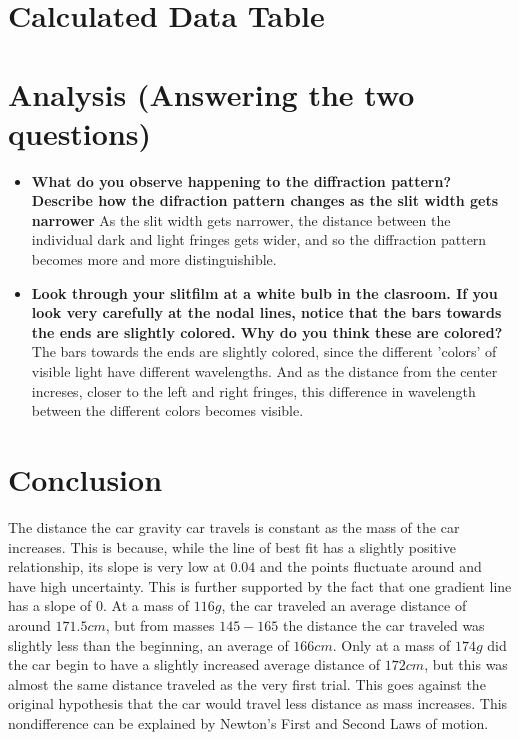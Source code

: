 \documentclass[12pt]{article}
\begin{document}
\section{Calculated Data Table}

\begin{table}[H]
	\def\arraystretch{1.5}
\end{table}

\section{Analysis (Answering the two questions)}


\begin{itemize}
	\item \textbf{What do you observe happening to the diffraction pattern? Describe how the difraction pattern changes as the slit width gets narrower}
	      \subitem As the slit width gets narrower, the distance between the individual dark and light fringes gets wider, and so the diffraction pattern becomes more and more distinguishible.
	\item \textbf{Look through your slitfilm at a white bulb in the clasroom. If you look very carefully at the nodal lines, notice that the bars towards the ends are slightly colored. Why do you think these are colored?}
	      \subitem The bars towards the ends are slightly colored, since the different 'colors' of visible light have different wavelengths. And as the distance from the center increses, closer to the left and right fringes, this difference in wavelength between the different colors becomes visible.
\end{itemize}

\section{Conclusion}
The distance the car gravity car travels is constant as the mass of the car increases. This is because, while the line of best fit has a slightly positive relationship, its slope is very low at \(0.04\) and the points fluctuate around and have high uncertainty. This is further supported by the fact that one gradient line has a slope of \(0\). At a mass of \(116g\), the car traveled an average distance of around \(171.5cm\), but from masses \(145-165\) the distance the car traveled was slightly less than the beginning, an average of \(166cm\). Only at a mass of \(174g\) did the car begin to have a slightly increased average distance of \(172cm\), but this was almost the same distance traveled as the very first trial. This goes against the original hypothesis that the car would travel less distance as mass increases. This nondifference can be explained by Newton's First and Second Laws of motion.
\end{document}
